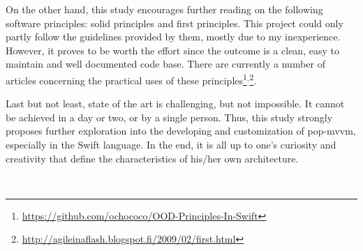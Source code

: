 \documentclass[11pt,a4paper,oneside,article]{memoir}
\begin{document}
On the other hand, this study encourages further reading on the following software principles: \gls{solid} principles and \gls{first} principles. This project could only partly follow the guidelines provided by them, mostly due to my inexperience. However, it proves to be worth the effort since the outcome is a clean, easy to maintain and well documented code base. There are currently a number of articles concerning the practical uses of these principles\footnote{\url{https://github.com/ochococo/OOD-Principles-In-Swift}}$^{,}$\footnote{\url{http://agileinaflash.blogspot.fi/2009/02/first.html}}. 

Last but not least, state of the art is challenging, but not impossible. It cannot be achieved in a day or two, or by a single person. Thus, this study strongly proposes further exploration into the developing and customization of \gls{pop-mvvm}, especially in the Swift language. In the end, it is all up to one's curiosity and creativity that define the characteristics of his/her own architecture.

\newpage

\begin{flushleft}
\begin{singlespacing}

\end{singlespacing}
\end{flushleft}
\label{LastPage}~
\clearpage

\appendix
\addappheadtotoc
\renewcommand{\thechapter}{\arabic{chapter}} 
\end{document}
